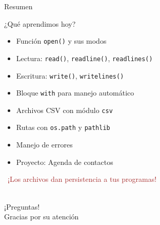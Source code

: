 \documentclass{beamer}
\begin{document}
\begin{frame}{Resumen \faListUl}
\begin{conceptbox}{¿Qué aprendimos hoy?}
\small
\begin{itemize}
    \item[\faCheck] Función \texttt{open()} y sus modos
    \item[\faCheck] Lectura: \texttt{read()}, \texttt{readline()}, \texttt{readlines()}
    \item[\faCheck] Escritura: \texttt{write()}, \texttt{writelines()}
    \item[\faCheck] Bloque \texttt{with} para manejo automático
    \item[\faCheck] Archivos CSV con módulo \texttt{csv}
    \item[\faCheck] Rutas con \texttt{os.path} y \texttt{pathlib}
    \item[\faCheck] Manejo de errores
    \item[\faCheck] Proyecto: Agenda de contactos
\end{itemize}
\end{conceptbox}

\vspace{0.3cm}
\begin{center}
\large\textcolor{brown}{\faFileAlt\ ¡Los archivos dan persistencia a tus programas!}
\end{center}
\end{frame}

\begin{frame}
\begin{center}
\Huge\textcolor{brown}{\faQuestionCircle}\\
\vspace{0.5cm}
\Huge ¡Preguntas!\\
\vspace{1cm}
\Large\textcolor{brownbright}{Gracias por su atención}
\end{center}
\end{frame}
\end{document}

